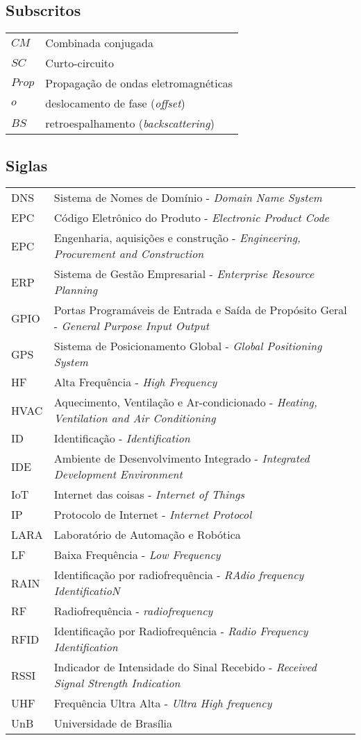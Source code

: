 \subsection*{Subscritos}

\begin{tabular}{p{}p{}}
$CM$  & Combinada conjugada \tabularnewline
$SC$  & Curto-circuito \tabularnewline
$Prop$  & Propagação de ondas eletromagnéticas \tabularnewline
$o$  & deslocamento de fase (\textit{offset})\tabularnewline
$BS$ & retroespalhamento (\textit{backscattering}) \tabularnewline
\end{tabular}





\subsection*{Siglas}

\begin{tabular}{p{}p{}}
DNS & Sistema de Nomes de Domínio -  \textit{Domain Name System} \tabularnewline
EPC  & Código Eletrônico do Produto - \textit{Electronic Product Code}\tabularnewline
EPC & Engenharia, aquisições e construção - \textit{Engineering, Procurement and Construction} \tabularnewline
ERP & Sistema de Gestão Empresarial - \textit{Enterprise Resource Planning} \tabularnewline
GPIO & Portas Programáveis de Entrada e Saída de Propósito Geral - \textit{General Purpose Input Output} \tabularnewline
GPS & Sistema de Posicionamento Global - \textit{Global Positioning System} \tabularnewline
HF & Alta Frequência - \textit{High Frequency} \tabularnewline
HVAC & Aquecimento, Ventilação e Ar-condicionado - \textit{Heating, Ventilation and Air Conditioning}\tabularnewline
ID & Identificação - \textit{Identification} \tabularnewline
IDE & Ambiente de Desenvolvimento Integrado - \textit{Integrated Development Environment} \tabularnewline
IoT & Internet das coisas - \textit{Internet of Things} \tabularnewline
IP & Protocolo de Internet - \textit{Internet Protocol} \tabularnewline
LARA & Laboratório de Automação e Robótica \tabularnewline
LF & Baixa Frequência - \textit{Low Frequency} \tabularnewline
RAIN & Identificação por radiofrequência - \textit{RAdio frequency IdentificatioN} \tabularnewline
RF & Radiofrequência - \textit{radiofrequency} \tabularnewline
RFID & Identificação por Radiofrequência - \textit{Radio Frequency Identification}\tabularnewline
RSSI &  Indicador de Intensidade do Sinal Recebido - \textit{Received Signal Strength Indication} \tabularnewline
UHF & Frequência Ultra Alta - \textit{Ultra High frequency} \tabularnewline
UnB & Universidade de Brasília \tabularnewline
\end{tabular}
